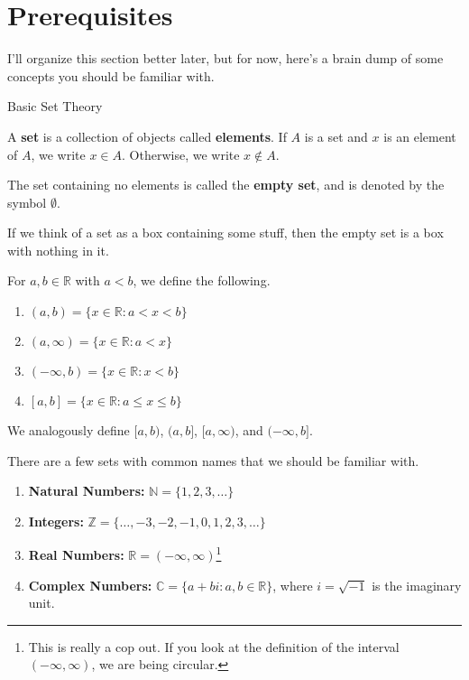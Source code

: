 \chapter{Prerequisites}
\label{chapter:prerequisites}
\thispagestyle{empty}

I'll organize this section better later, but for now, here's a brain dump of some concepts you should be familiar with.

\begin{section}{Basic Set Theory}

\begin{definition}
A \textbf{set} is a collection of objects called \textbf{elements}. If $A$ is a set and $x$ is an element of $A$, we write
$x\in A$. Otherwise, we write $x\notin A$.
\end{definition}

\begin{definition}
The set containing no elements is called the \textbf{empty set}, and is denoted by the symbol $\emptyset$.
\end{definition}

If we think of a set as a box containing some stuff, then the empty set is a box with nothing in it.

\begin{definition}
For $a,b\in\mathbb{R}$ with $a<b$, we define the following.
\begin{enumerate}
\item $(a,b)=\{x\in\mathbb{R}:a<x<b\}$
\item $(a,\infty)=\{x\in\mathbb{R}:a<x\}$
\item $(-\infty,b)=\{x\in\mathbb{R}:x<b\}$
\item $[a,b]=\{x\in\mathbb{R}:a\leq x\leq b\}$
\end{enumerate}
We analogously define $[a,b)$, $(a,b]$, $[a,\infty)$, and $(-\infty,b]$.
\end{definition}

\begin{remark}
There are a few sets with common names that we should be familiar with.
\begin{enumerate}
\item \textbf{Natural Numbers:} $\mathbb{N}=\{1,2,3,\ldots\}$
\item \textbf{Integers:} $\mathbb{Z}=\{\ldots,-3,-2,-1,0,1,2,3,\ldots\}$
\item \textbf{Real Numbers:} $\mathbb{R}=(-\infty,\infty)$\footnote{This is really a cop out.  If you look at the definition of the interval $(-\infty,\infty)$, we are being circular.}
\item \textbf{Complex Numbers:} $\mathbb{C}=\{a+bi:a,b\in\mathbb{R}\}$, where $i=\sqrt{-1}$ is the imaginary unit.
\end{enumerate}
\end{remark}


\end{section}
